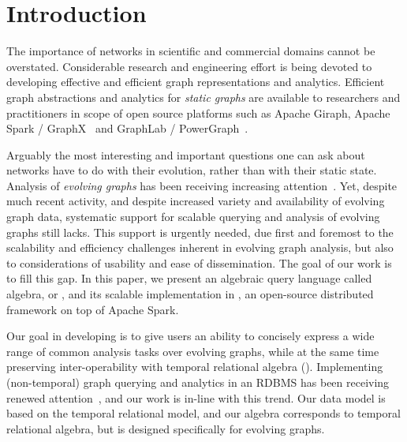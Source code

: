 \section{Introduction}
\label{sec:intro}


The importance of networks in scientific and commercial domains cannot
be overstated.  Considerable research and engineering effort is being
devoted to developing effective and efficient graph representations
and analytics.  Efficient graph abstractions and analytics for {\em
  static graphs} are available to researchers and practitioners in
scope of open source platforms such as Apache Giraph, Apache Spark /
GraphX~\cite{DBLP:conf/osdi/GonzalezXDCFS14} and GraphLab /
PowerGraph~\cite{DBLP:conf/osdi/GonzalezLGBG12}.

Arguably the most interesting and important questions one can ask
about networks have to do with their evolution, rather than with their
static state.  Analysis of {\em evolving graphs} has been receiving
increasing
attention~\cite{DBLP:journals/csur/AggarwalS14,Chan2008,Kan2009,Miao2015,Ren2011,Semertzidis2015}.
Yet, despite much recent activity, and despite increased variety and
availability of evolving graph data, systematic support for scalable
querying and analysis of evolving graphs still lacks.  This support is
urgently needed, due first and foremost to the scalability and
efficiency challenges inherent in evolving graph analysis, but also to
considerations of usability and ease of dissemination.  The goal of
our work is to fill this gap.  In this paper, we present an algebraic
query language called \tg algebra, or \tga, and its scalable
implementation in \ql, an open-source distributed framework on top of
Apache Spark.

Our goal in developing \tga is to give users an ability to concisely
express a wide range of common analysis tasks over evolving graphs,
while at the same time preserving inter-operability with temporal
relational algebra (\tra).  Implementing (non-temporal) graph querying
and analytics in an RDBMS has been receiving renewed
attention~\cite{DBLP:conf/sigmod/AbergerTOR16,DBLP:conf/sigmod/SunFSKHX15,DBLP:journals/pvldb/Xirogiannopoulos15},
and our work is in-line with this trend. Our data model is based on
the temporal relational model, and our algebra corresponds to temporal
relational algebra, but is designed specifically for evolving graphs.


